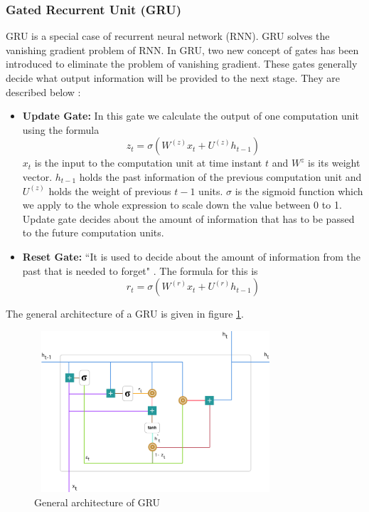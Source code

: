 \subsubsection{Gated Recurrent Unit (GRU)}
GRU is a special case of recurrent neural network (RNN). GRU solves the vanishing gradient problem of RNN. In GRU, two new concept of gates has been introduced to eliminate the problem of vanishing gradient. These gates generally decide what output information will be provided to the next stage. They are described below : 
\begin{itemize}
    \item \textbf{Update Gate: } In this gate we calculate the output of one computation unit using the formula $$z_t=\sigma(W^{(z)}x_t+U^{(z)}h_{t-1})$$
    $x_t$ is the input to the computation unit at time instant $t$ and $W^{z}$ is its weight vector. $h_{t-1}$ holds the past information of the previous computation unit and $U^{(z)}$ holds the weight of previous $t-1$ units. $\sigma$ is the sigmoid function which we apply to the whole expression to scale down the value between 0 to 1. Update gate decides about the amount of information that has to be passed to the future computation units.
    \item \textbf{Reset Gate: }``It is used to decide about the amount of information from the past that is needed to forget" \cite{b2}. The formula for this is $$r_t=\sigma(W^{(r)}x_t+U^{(r)}h_{t-1})$$
\end{itemize}
The general architecture of a GRU is given in figure \ref{fig3}.
\begin{figure}[!htb]
\centerline{\includegraphics[height=60mm,width=90mm]{img/fig3.png}}
\caption{General architecture of GRU \cite{b2}}
\label{fig3}
\end{figure}

